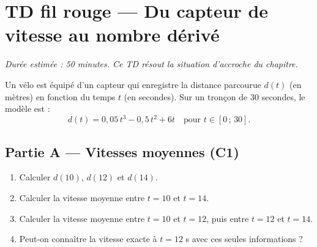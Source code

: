 

\section*{TD fil rouge — Du capteur de vitesse au nombre dérivé}

\textit{Durée estimée : 50 minutes. Ce TD résout la situation d'accroche du chapitre.}

\bigskip

Un vélo est équipé d'un capteur qui enregistre la distance parcourue $d(t)$ (en mètres) en fonction du temps $t$ (en secondes). Sur un tronçon de $30$ secondes, le modèle est :
\[
  d(t) = 0{,}05\,t^3 - 0{,}5\,t^2 + 6t \quad \text{pour } t \in [0\,;\,30].
\]

\subsection*{Partie A — Vitesses moyennes (C1)}

\begin{enumerate}
  \item Calculer $d(10)$, $d(12)$ et $d(14)$.
  \item Calculer la vitesse moyenne entre $t=10$ et $t=14$.
  \item Calculer la vitesse moyenne entre $t=10$ et $t=12$, puis entre $t=12$ et $t=14$.
  \item Peut-on connaître la vitesse exacte à $t=12$ s avec ces seules informations ?
\end{enumerate}



